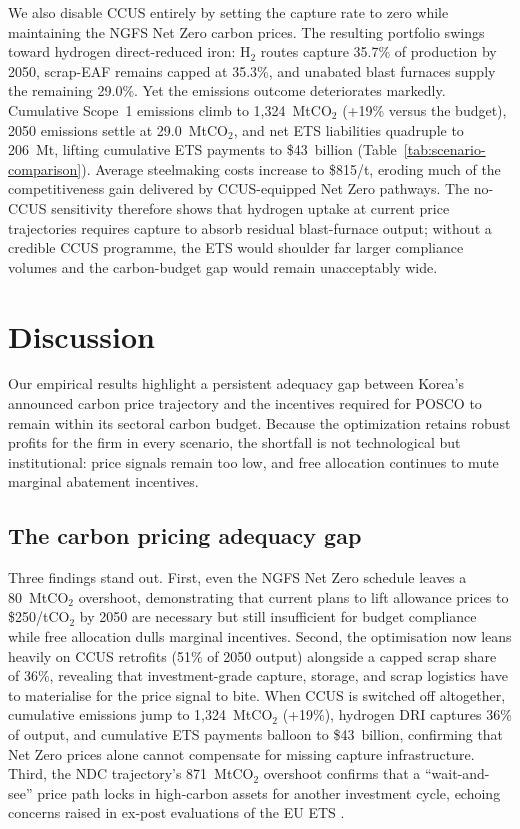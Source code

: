 \documentclass[preprint,1p,authoryear]{elsarticle}
\begin{document}
We also disable CCUS entirely by setting the capture rate to zero while maintaining the NGFS Net Zero carbon prices. The resulting portfolio swings toward hydrogen direct-reduced iron: H$_2$ routes capture 35.7\% of production by 2050, scrap-EAF remains capped at 35.3\%, and unabated blast furnaces supply the remaining 29.0\%. Yet the emissions outcome deteriorates markedly. Cumulative Scope~1 emissions climb to 1{,}324~MtCO$_2$ (+19\% versus the budget), 2050 emissions settle at 29.0~MtCO$_2$, and net ETS liabilities quadruple to 206~Mt, lifting cumulative ETS payments to \$43~billion (Table~\ref{tab:scenario-comparison}). Average steelmaking costs increase to \$815/t, eroding much of the competitiveness gain delivered by CCUS-equipped Net Zero pathways. The no-CCUS sensitivity therefore shows that hydrogen uptake at current price trajectories requires capture to absorb residual blast-furnace output; without a credible CCUS programme, the ETS would shoulder far larger compliance volumes and the carbon-budget gap would remain unacceptably wide.

\section{Discussion}

Our empirical results highlight a persistent adequacy gap between Korea's announced carbon price trajectory and the incentives required for POSCO to remain within its sectoral carbon budget. Because the optimization retains robust profits for the firm in every scenario, the shortfall is not technological but institutional: price signals remain too low, and free allocation continues to mute marginal abatement incentives.

\subsection{The carbon pricing adequacy gap}

Three findings stand out. First, even the NGFS Net Zero schedule leaves a 80~MtCO$_2$ overshoot, demonstrating that current plans to lift allowance prices to \$250/tCO$_2$ by 2050 are necessary but still insufficient for budget compliance while free allocation dulls marginal incentives. Second, the optimisation now leans heavily on CCUS retrofits (51\% of 2050 output) alongside a capped scrap share of 36\%, revealing that investment-grade capture, storage, and scrap logistics have to materialise for the price signal to bite. When CCUS is switched off altogether, cumulative emissions jump to 1,324~MtCO$_2$ (+19\%), hydrogen DRI captures 36\% of output, and cumulative ETS payments balloon to \$43~billion, confirming that Net Zero prices alone cannot compensate for missing capture infrastructure. Third, the NDC trajectory's 871~MtCO$_2$ overshoot confirms that a “wait-and-see” price path locks in high-carbon assets for another investment cycle, echoing concerns raised in ex-post evaluations of the EU ETS \citep{Green2021, martin2016industry}.
\end{document}
